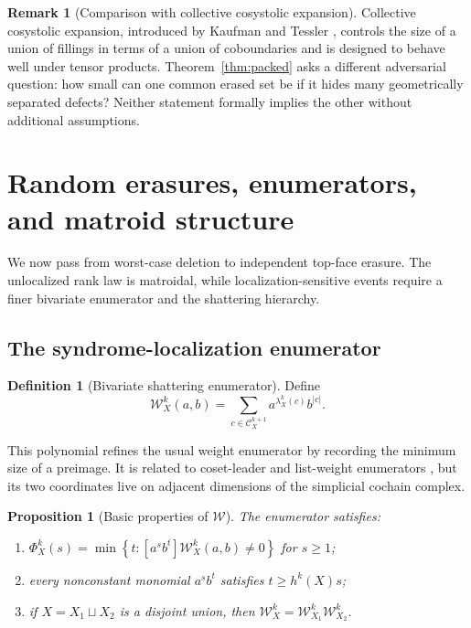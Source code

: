 \documentclass[11pt,letterpaper]{article}
\theoremstyle{plain}
\newtheorem{proposition}[theorem]{Proposition}
\theoremstyle{definition}
\newtheorem{definition}[theorem]{Definition}
\newtheorem{remark}[theorem]{Remark}
\newcommand{\cC}{\mathcal{C}}
\newcommand{\cW}{\mathcal{W}}
\newcommand{\1}{\mathbf{1}}
\newcommand{\abs}[1]{\left|#1\right|}
\newcommand{\set}[1]{\left\{#1\right\}}
\begin{document}
\begin{remark}[Comparison with collective cosystolic expansion]
\label{rem:collective}
Collective cosystolic expansion, introduced by Kaufman and Tessler
\cite{kaufmantessler2021}, controls the size of a union of fillings in terms of a union of
coboundaries and is designed to behave well under tensor products.  Theorem~\ref{thm:packed}
asks a different adversarial question: how small can one common erased set be if it hides
many geometrically separated defects?  Neither statement formally implies the other
without additional assumptions.
\end{remark}

\section{Random erasures, enumerators, and matroid structure}
\label{sec:random}

We now pass from worst-case deletion to independent top-face erasure.  The unlocalized
rank law is matroidal, while localization-sensitive events require a finer bivariate
enumerator and the shattering hierarchy.


\subsection{The syndrome-localization enumerator}

\begin{definition}[Bivariate shattering enumerator]\label{def:enumerator}
Define
\begin{equation}\label{eq:enumerator}
 \cW_X^k(a,b)=\sum_{c\in\cC_X^{k+1}}
 a^{\lambda_X^k(c)}b^{\abs c}.
\end{equation}
\end{definition}

This polynomial refines the usual weight enumerator by recording the minimum size of a
preimage.  It is related to coset-leader and list-weight enumerators
\cite{jurriuspellikaan2015}, but its two coordinates live on adjacent dimensions of the
simplicial cochain complex.

\begin{proposition}[Basic properties of $\cW$]\label{prop:enumerator}
The enumerator satisfies:
\begin{enumerate}[label=\textup{(\roman*)},leftmargin=2.2em]
\item
$\Phi_X^k(s)=\min\set{t:[a^s b^t]\cW_X^k(a,b)\ne0}$ for $s\ge1$;
\item every nonconstant monomial $a^s b^t$ satisfies $t\ge h^k(X)s$;
\item if $X=X_1\sqcup X_2$ is a disjoint union, then
$\cW_X^k=\cW_{X_1}^k\cW_{X_2}^k$.
\end{enumerate}
\end{proposition}
\end{document}

